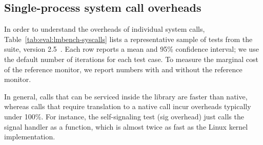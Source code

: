 \subsection{Single-process system call overheads}
\label{eval:perf:syscalls}


In order to understand the overheads of individual system calls,
Table~\ref{tab:eval:lmbench-syscalls} lists 
a representative sample of 
tests from the
\lmbench{} suite, version 2.5~\cite{McVoy:lmbench}.
Each row reports a mean and 95\% confidence interval;
we use the default number of iterations for each test case.
To measure the marginal cost of the reference monitor, we report numbers with and without 
the reference monitor.

In general, calls that can be serviced inside the library are faster than native,
whereas calls that require translation to a native call incur overheads typically under 100\%.
For instance, 
the self-signaling test (sig overhead)
just calls the signal handler as a function,
which is almost twice as fast
as the Linux kernel implementation.  

\begin{table}[t!b!]

\caption[\lmbench{} benchmarking results in Linux, KVM and \graphene{}]
{\lmbench{} comparison among (1) native Linux processes, (2) \graphene{} \picoprocs{} on Linux host, both without and with the SECCOMP filter ({\bf +SC}) and reference monitor ({\bf +RM}), and (3) \graphene{} in SGX enclaves.
Execution time is in microseconds, and lower is better. 
Overheads are relative to Linux; negative overheads indicate improved performance.} 
\label{tab:eval:lmbench-syscalls}
\end{table}


